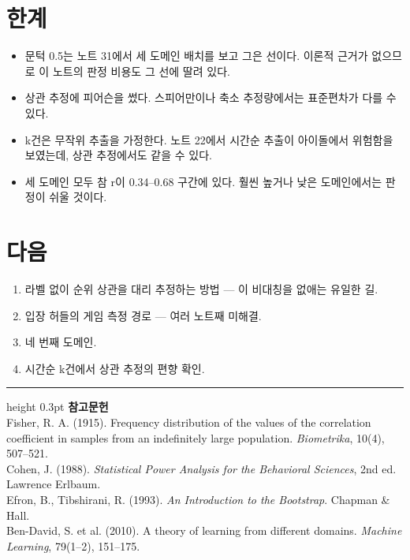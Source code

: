 \documentclass[10pt]{article}
\begin{document}
\section{한계}

\begin{itemize}[leftmargin=1.1em,itemsep=0.15em]
\item 문턱 0.5는 노트 31에서 세 도메인 배치를 보고 그은 선이다. 이론적 근거가
      없으므로 이 노트의 판정 비용도 그 선에 딸려 있다.
\item 상관 추정에 피어슨을 썼다. 스피어만이나 축소 추정량에서는 표준편차가
      다를 수 있다.
\item k건은 무작위 추출을 가정한다. 노트 22에서 시간순 추출이 아이돌에서
      위험함을 보였는데, 상관 추정에서도 같을 수 있다.
\item 세 도메인 모두 참 r이 0.34--0.68 구간에 있다. 훨씬 높거나 낮은 도메인에서는
      판정이 쉬울 것이다.
\end{itemize}

\section{다음}

\begin{enumerate}[leftmargin=1.3em,itemsep=0.15em]
\item 라벨 없이 순위 상관을 대리 추정하는 방법 --- 이 비대칭을 없애는 유일한 길.
\item 입장 허들의 게임 측정 경로 --- 여러 노트째 미해결.
\item 네 번째 도메인.
\item 시간순 k건에서 상관 추정의 편향 확인.
\end{enumerate}

\vspace{0.6em}
\hrule height 0.3pt
\vspace{0.5em}
{\footnotesize
\textbf{참고문헌}\\[0.3em]
Fisher, R. A. (1915). Frequency distribution of the values of the correlation
coefficient in samples from an indefinitely large population.
\emph{Biometrika}, 10(4), 507--521.\\[0.15em]
Cohen, J. (1988). \emph{Statistical Power Analysis for the Behavioral Sciences},
2nd ed. Lawrence Erlbaum.\\[0.15em]
Efron, B., Tibshirani, R. (1993). \emph{An Introduction to the Bootstrap}.
Chapman \& Hall.\\[0.15em]
Ben-David, S. et al. (2010). A theory of learning from different domains.
\emph{Machine Learning}, 79(1--2), 151--175.
}
\end{document}
